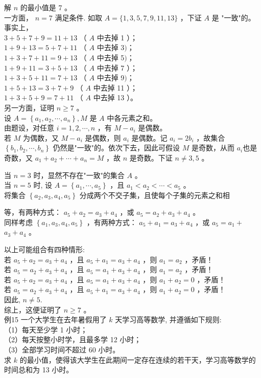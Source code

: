 \documentclass[10pt]{article}
\begin{document}
解 $n$ 的最小值是 7 。\\
一方面， $n=7$ 满足条件. 如取 $A=\{1,3,5,7,9,11,13\}$ ，下证 $A$ 是 "一致"的。事实上，\\
$3+5+7+9=11+13$ （ $A$ 中去掉 1 ）；\\
$1+9+13=5+7+11$ （ $A$ 中去掉 3$) ；$\\
$1+3+7+11=9+13$ （ $A$ 中去掉 5$) ；$\\
$1+9+11=3+5+13$ （ $A$ 中去掉 7 ）；\\
$1+3+5+11=7+13$ （ $A$ 中去掉 9$) ；$\\
$1+5+13=3+7+9$ （ $A$ 中去掉 11 ）；\\
$1+3+5+9=7+11$ （ $A$ 中去掉 13 ）。\\
另一方面，证明 $n \geqslant 7$ 。\\
设 $A=\left\{a_{1}, a_{2}, \cdots, a_{n}\right\}, M$ 是 $A$ 中各元素之和。\\
由题设，对任意 $i=1,2, \cdots, n$ ，有 $M-a_{i}$ 是偶数。\\
若 $M$ 为偶数，又 $M-a_{i}$ 是偶数，则 $a_{i}$ 是偶数。记 $a_{i}=2 b_{i}$ ，故集合 $\left\{b_{1}, b_{2}, \cdots, b_{n}\right\}$ 仍然是"一致"的。依次下去，因此可假设 $M$ 是奇数，从而 $a_{i}$也是奇数，又 $a_{1}+a_{2}+\cdots+a_{n}=M$ ，故 $n$ 是奇数。下证 $n \neq 3,5$ 。

当 $n=3$ 时，显然不存在"一致"的集合 $A$ 。\\
当 $n=5$ 时, 设 $A=\left\{a_{1}, \cdots, a_{5}\right\}$ ，且 $a_{1}<a_{2}<\cdots<a_{5}$ 。\\
将集合 $\left\{a_{2}, a_{3}, a_{4}, a_{5}\right\}$ 分成两个不交子集，且使每个子集的元素之和相

等，有两种方式： $a_{5}+a_{2}=a_{3}+a_{4}$ ，或 $a_{5}=a_{2}+a_{3}+a_{4}$ 。\\
同样考虑 $\left\{a_{1}, a_{3}, a_{4}, a_{5}\right\}$ ，有两种方式： $a_{5}+a_{1}=a_{3}+a_{4}$ ，或 $a_{5}=a_{1}+$ $a_{3}+a_{4}$ 。

以上可能组合有四种情形:\\
若 $a_{5}+a_{2}=a_{3}+a_{4}$ ，且 $a_{5}+a_{1}=a_{3}+a_{4}$ ，则 $a_{1}=a_{2}$ ，矛盾！\\
若 $a_{5}=a_{2}+a_{3}+a_{4}$ ，且 $a_{5}=a_{1}+a_{3}+a_{4}$ ，则 $a_{1}=a_{2}$ ，矛盾！\\
若 $a_{5}+a_{2}=a_{3}+a_{4}$ ，且 $a_{5}=a_{1}+a_{3}+a_{4}$ ，则 $a_{1}+a_{2}=0$ ，矛盾！\\
若 $a_{5}=a_{2}+a_{3}+a_{4}$ ，且 $a_{5}+a_{1}=a_{3}+a_{4}$ ，则 $a_{1}+a_{2}=0$ ，矛盾！\\
因此, $n \neq 5$.\\
综上，这便证明了 $n \geqslant 7$ 。\\
例15 一个大学生在去年暑假用了 $k$ 天学习高等数学, 并遵循如下规则:\\
（1）每天至少学 1 小时；\\
（2）每天按整小时学，且最多学 12 小时；\\
（3）全部学习时间不超过 60 小时。\\
求 $k$ 的最小值，使得该大学生在此期间一定存在连续的若干天，学习高等数学的时间总和为 13 小时。
\end{document}
